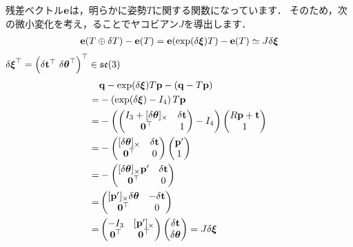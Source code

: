 残差ベクトル${\bf e}$は，明らかに姿勢$T$に関する関数になっています．
そのため，次の微小変化を考え，ることでヤコビアン$J$を導出します．
%
\begin{align}
  {\bf e}(T \oplus \delta T) - {\bf e}(T) = 
  {\bf e}(\exp(\delta \boldsymbol \xi) T) - {\bf e}(T) \simeq
  J \delta \boldsymbol \xi
\end{align}
%
$\delta \boldsymbol \xi^{\top} = \left( \delta {\bf t}^{\top} ~ \delta \boldsymbol \theta^{\top} \right)^{\top} \in \mathfrak{se}(3)$
%
\begin{align}
  \begin{split}
    & {\bf q} - \exp(\delta \boldsymbol \xi) T {\bf p} - \left( {\bf q} - T {\bf p} \right) \\
    = & - \left( \exp(\delta \boldsymbol \xi) - I_{4} \right) T {\bf p} \\
    = & - \left( \left( \begin{matrix} I_{3} + [\delta \boldsymbol \theta]_{\times} & \delta {\bf t} \\ {\bf 0}^{\top} & 1 \end{matrix} \right) - I_{4} \right) \left( \begin{matrix} R {\bf p} + {\bf t} \\ 1 \end{matrix} \right) \\
    = & - \left( \begin{matrix} [\delta \boldsymbol \theta]_{\times} & \delta {\bf t} \\ {\bf 0}^{\top} & 0 \end{matrix} \right) \left( \begin{matrix} {\bf p}' \\ 1 \end{matrix} \right) \\
     = & - \left( \begin{matrix} [\delta \boldsymbol \theta]_{\times} {\bf p}' & \delta {\bf t} \\ {\bf 0}^{\top} & 0 \end{matrix} \right) \\
     = & \left( \begin{matrix} [{\bf p}']_{\times} \delta \boldsymbol \theta & - \delta {\bf t} \\ {\bf 0}^{\top} & 0 \end{matrix} \right) \\
     = & \left( \begin{matrix} -I_{3} & [{\bf p}']_{\times} \\ {\bf 0}^{\top} & {\bf 0}^{\top} \end{matrix} \right) \left( \begin{matrix} \delta {\bf t} \\ \delta \boldsymbol \theta \end{matrix} \right) =
     J \delta \boldsymbol \xi
  \end{split}
\end{align}

